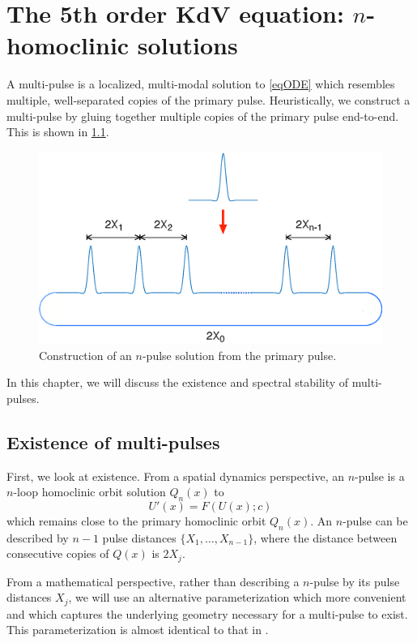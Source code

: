 \documentclass[thesis.tex]{subfiles}
\begin{document}
\iffulldocument\else
	\chapter{The 5th order KdV equation: $n$-homoclinic solutions}
\fi

A multi-pulse is a localized, multi-modal solution to \cref{eqODE} which resembles multiple, well-separated copies of the primary pulse. Heuristically, we construct a multi-pulse by gluing together multiple copies of the primary pulse end-to-end. This is shown in \cref{fig:multipulse}.
\begin{figure}
\begin{center}
\includegraphics[width=12cm]{images/kdv5numerics/multipulseperiodic.eps}
\end{center}
\caption{Construction of an $n$-pulse solution from the primary pulse.}
\label{fig:multipulse}
\end{figure}

\noi In this chapter, we will discuss the existence and spectral stability of multi-pulses.

\section{Existence of multi-pulses}\label{sec:multiexistR}

First, we look at existence. From a spatial dynamics perspective, an $n$-pulse is a $n$-loop homoclinic orbit solution $Q_n(x)$ to
\begin{equation}\label{existgenODE1}
U'(x) = F(U(x); c)
\end{equation}
which remains close to the primary homoclinic orbit $Q_n(x)$. An $n$-pulse can be described by $n-1$ pulse distances $\{X_1, \dots, X_{n-1} \}$, where the distance between consecutive copies of $Q(x)$ is $2 X_j$.

From a mathematical perspective, rather than describing a $n$-pulse by its pulse distances $X_j$, we will use an alternative parameterization which more convenient and which captures the underlying geometry necessary for a multi-pulse to exist. This parameterization is almost identical to that in \cite{SandstedeStrut,Sandstede1998}.
\end{document}
